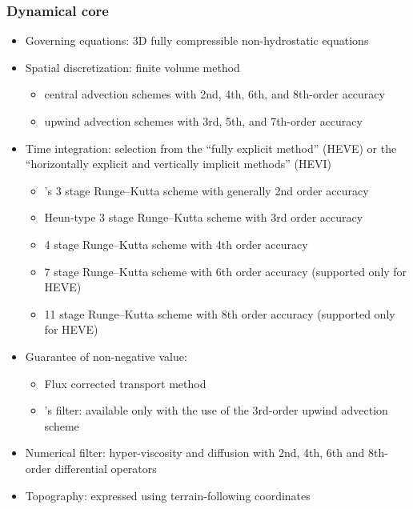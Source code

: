 \subsubsection{Dynamical core}
\begin{itemize}
 \item Governing equations: 3D fully compressible non-hydrostatic equations
 \item Spatial discretization: finite volume method
    \begin{itemize}
      \item central advection schemes with 2nd, 4th, 6th, and 8th-order accuracy
      \item upwind advection schemes with 3rd, 5th, and 7th-order accuracy
    \end{itemize}
 \item Time integration: selection from the ``fully explicit method'' (HEVE)
   or the ``horizontally explicit and vertically implicit methods'' (HEVI)
    \begin{itemize}
      \item \citet{Wicker_2002}'s 3 stage Runge--Kutta scheme with generally 2nd order accuracy
      \item Heun-type 3 stage Runge--Kutta scheme with 3rd order accuracy
      \item 4 stage Runge--Kutta scheme with 4th order accuracy
      \item 7 stage Runge--Kutta scheme with 6th order accuracy (supported only for HEVE)
      \item 11 stage Runge--Kutta scheme with 8th order accuracy (supported only for HEVE)
    \end{itemize}
 \item Guarantee of non-negative value:
    \begin{itemize}
      \item Flux corrected transport method \citep{zalesak_1979}
      \item \citet{Koren_1993}'s filter: available only with the use of the 3rd-order upwind advection scheme
    \end{itemize}
 \item Numerical filter: hyper-viscosity and diffusion with 2nd, 4th, 6th and 8th-order differential operators 
 \item Topography: expressed using terrain-following coordinates
\end{itemize}


